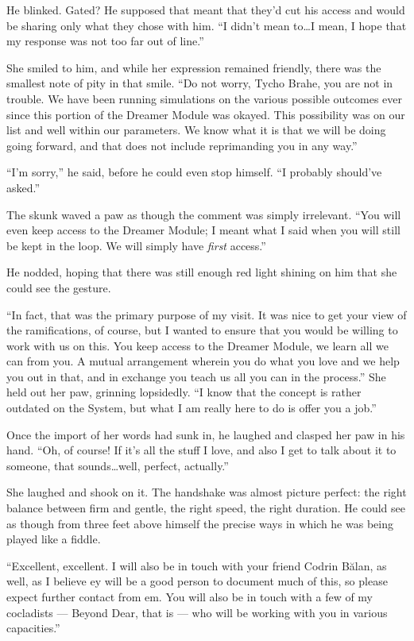 He blinked. Gated? He supposed that meant that they'd cut his access and would be sharing only what they chose with him. ``I didn't mean to\ldots I mean, I hope that my response was not too far out of line.''

She smiled to him, and while her expression remained friendly, there was the smallest note of pity in that smile. ``Do not worry, Tycho Brahe, you are not in trouble. We have been running simulations on the various possible outcomes ever since this portion of the Dreamer Module was okayed. This possibility was on our list and well within our parameters. We know what it is that we will be doing going forward, and that does not include reprimanding you in any way.''

``I'm sorry,'' he said, before he could even stop himself. ``I probably should've asked.''

The skunk waved a paw as though the comment was simply irrelevant. ``You will even keep access to the Dreamer Module; I meant what I said when you will still be kept in the loop. We will simply have \emph{first} access.''

He nodded, hoping that there was still enough red light shining on him that she could see the gesture.

``In fact, that was the primary purpose of my visit. It was nice to get your view of the ramifications, of course, but I wanted to ensure that you would be willing to work with us on this. You keep access to the Dreamer Module, we learn all we can from you. A mutual arrangement wherein you do what you love and we help you out in that, and in exchange you teach us all you can in the process.'' She held out her paw, grinning lopsidedly. ``I know that the concept is rather outdated on the System, but what I am really here to do is offer you a job.''

Once the import of her words had sunk in, he laughed and clasped her paw in his hand. ``Oh, of course! If it's all the stuff I love, and also I get to talk about it to someone, that sounds\ldots well, perfect, actually.''

She laughed and shook on it. The handshake was almost picture perfect: the right balance between firm and gentle, the right speed, the right duration. He could see as though from three feet above himself the precise ways in which he was being played like a fiddle.

``Excellent, excellent. I will also be in touch with your friend Codrin Bălan, as well, as I believe ey will be a good person to document much of this, so please expect further contact from em. You will also be in touch with a few of my cocladists — Beyond Dear, that is — who will be working with you in various capacities.''

